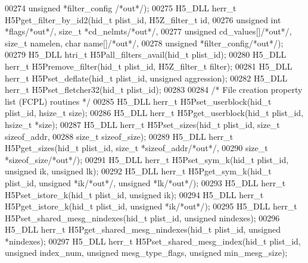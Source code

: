 \begin{DoxyCode}
00274        \textcolor{keywordtype}{unsigned} *filter\_config \textcolor{comment}{/*out*/});
00275 H5\_DLL herr\_t H5Pget\_filter\_by\_id2(hid\_t plist\_id, H5Z\_filter\_t \textcolor{keywordtype}{id},
00276        \textcolor{keywordtype}{unsigned} \textcolor{keywordtype}{int} *flags\textcolor{comment}{/*out*/}, \textcolor{keywordtype}{size\_t} *cd\_nelmts\textcolor{comment}{/*out*/},
00277        \textcolor{keywordtype}{unsigned} cd\_values[]\textcolor{comment}{/*out*/}, \textcolor{keywordtype}{size\_t} namelen, \textcolor{keywordtype}{char} name[]\textcolor{comment}{/*out*/},
00278        \textcolor{keywordtype}{unsigned} *filter\_config\textcolor{comment}{/*out*/});
00279 H5\_DLL htri\_t H5Pall\_filters\_avail(hid\_t plist\_id);
00280 H5\_DLL herr\_t H5Premove\_filter(hid\_t plist\_id, H5Z\_filter\_t filter);
00281 H5\_DLL herr\_t H5Pset\_deflate(hid\_t plist\_id, \textcolor{keywordtype}{unsigned} aggression);
00282 H5\_DLL herr\_t H5Pset\_fletcher32(hid\_t plist\_id);
00283 
00284 \textcolor{comment}{/* File creation property list (FCPL) routines */}
00285 H5\_DLL herr\_t H5Pset\_userblock(hid\_t plist\_id, hsize\_t size);
00286 H5\_DLL herr\_t H5Pget\_userblock(hid\_t plist\_id, hsize\_t *size);
00287 H5\_DLL herr\_t H5Pset\_sizes(hid\_t plist\_id, \textcolor{keywordtype}{size\_t} sizeof\_addr,
00288        \textcolor{keywordtype}{size\_t} sizeof\_size);
00289 H5\_DLL herr\_t H5Pget\_sizes(hid\_t plist\_id, \textcolor{keywordtype}{size\_t} *sizeof\_addr\textcolor{comment}{/*out*/},
00290        \textcolor{keywordtype}{size\_t} *sizeof\_size\textcolor{comment}{/*out*/});
00291 H5\_DLL herr\_t H5Pset\_sym\_k(hid\_t plist\_id, \textcolor{keywordtype}{unsigned} ik, \textcolor{keywordtype}{unsigned} lk);
00292 H5\_DLL herr\_t H5Pget\_sym\_k(hid\_t plist\_id, \textcolor{keywordtype}{unsigned} *ik\textcolor{comment}{/*out*/}, \textcolor{keywordtype}{unsigned} *lk\textcolor{comment}{/*out*/});
00293 H5\_DLL herr\_t H5Pset\_istore\_k(hid\_t plist\_id, \textcolor{keywordtype}{unsigned} ik);
00294 H5\_DLL herr\_t H5Pget\_istore\_k(hid\_t plist\_id, \textcolor{keywordtype}{unsigned} *ik\textcolor{comment}{/*out*/});
00295 H5\_DLL herr\_t H5Pset\_shared\_mesg\_nindexes(hid\_t plist\_id, \textcolor{keywordtype}{unsigned} nindexes);
00296 H5\_DLL herr\_t H5Pget\_shared\_mesg\_nindexes(hid\_t plist\_id, \textcolor{keywordtype}{unsigned} *nindexes);
00297 H5\_DLL herr\_t H5Pset\_shared\_mesg\_index(hid\_t plist\_id, \textcolor{keywordtype}{unsigned} index\_num, \textcolor{keywordtype}{unsigned} mesg\_type\_flags, \textcolor{keywordtype}{
      unsigned} min\_mesg\_size);

\end{DoxyCode}
